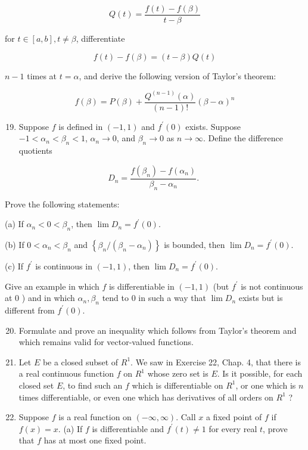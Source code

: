 \documentclass[10pt]{article}
\begin{document}
$$
Q(t)=\frac{f(t)-f(\beta)}{t-\beta}
$$

for $t \in[a, b], t \neq \beta$, differentiate

$$
f(t)-f(\beta)=(t-\beta) Q(t)
$$

$n-1$ times at $t=\alpha$, and derive the following version of Taylor's theorem:

$$
f(\beta)=P(\beta)+\frac{Q^{(n-1)}(\alpha)}{(n-1) !}(\beta-\alpha)^{n}
$$

\begin{enumerate}
  \setcounter{enumi}{18}
  \item Suppose $f$ is defined in $(-1,1)$ and $f^{\prime}(0)$ exists. Suppose $-1<\alpha_{n}<\beta_{n}<1$, $\alpha_{n} \rightarrow 0$, and $\beta_{n} \rightarrow 0$ as $n \rightarrow \infty$. Define the difference quotients
\end{enumerate}

$$
D_{n}=\frac{f\left(\beta_{n}\right)-f\left(\alpha_{n}\right)}{\beta_{n}-\alpha_{n}} \text {. }
$$

Prove the following statements:

(a) If $\alpha_{n}<0<\beta_{n}$, then $\lim D_{n}=f^{\prime}(0)$.

(b) If $0<\alpha_{n}<\beta_{n}$ and $\left\{\beta_{n} /\left(\beta_{n}-\alpha_{n}\right)\right\}$ is bounded, then $\lim D_{n}=f^{\prime}(0)$.

(c) If $f^{\prime}$ is continuous in $(-1,1)$, then $\lim D_{n}=f^{\prime}(0)$.

Give an example in which $f$ is differentiable in $(-1,1)$ (but $f^{\prime}$ is not continuous at 0 ) and in which $\alpha_{n}, \beta_{n}$ tend to 0 in such a way that $\lim D_{n}$ exists but is different from $f^{\prime}(0)$.

\begin{enumerate}
  \setcounter{enumi}{19}
  \item Formulate and prove an inequality which follows from Taylor's theorem and which remains valid for vector-valued functions.

  \item Let $E$ be a closed subset of $R^{1}$. We saw in Exercise 22, Chap. 4, that there is a real continuous function $f$ on $R^{1}$ whose zero set is $E$. Is it possible, for each closed set $E$, to find such an $f$ which is differentiable on $R^{1}$, or one which is $n$ times differentiable, or even one which has derivatives of all orders on $R^{1}$ ?

  \item Suppose $f$ is a real function on $(-\infty, \infty)$. Call $x$ a fixed point of $f$ if $f(x)=x$. (a) If $f$ is differentiable and $f^{\prime}(t) \neq 1$ for every real $t$, prove that $f$ has at most one fixed point.

\end{enumerate}
\end{document}
